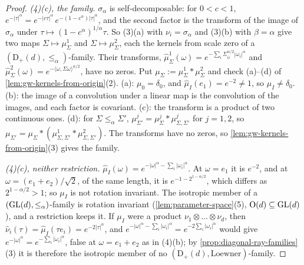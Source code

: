 \begin{proof}
\emph{(4)(c), the family.} $\sigma_\alpha$ is self-decomposable: for $0 < c < 1$,
$e^{-|\tau|^\alpha} = e^{-|c\tau|^\alpha}\,e^{-(1-c^\alpha)|\tau|^\alpha}$, and the second factor is the
transform of the image of $\sigma_\alpha$ under $\tau \mapsto (1 - c^\alpha)^{1/\alpha}\tau$. So (3)(a) with
$\nu_i = \sigma_\alpha$ and (3)(b) with $\beta = \alpha$ give two maps $\Sigma \mapsto \mu^1_\Sigma$ and
$\Sigma \mapsto \mu^2_\Sigma$, each the kernels from scale zero of a $(\mathrm D_+(d), \le_\alpha)$-family. Their
transforms, $\widehat\mu^1_\Sigma(\omega) = e^{-\sum_i\Sigma_{ii}^{\alpha/2}|\omega_i|^\alpha}$ and
$\widehat\mu^2_\Sigma(\omega) = e^{-\langle\omega,\Sigma\omega\rangle^{\alpha/2}}$, have no zeros. Put
$\mu_\Sigma := \mu^1_\Sigma * \mu^2_\Sigma$ and check (a)--(d) of \ref{lem:gw-kernels-from-origin}(2). (a):
$\mu_0 = \delta_0$, and $\widehat\mu_I(e_1) = e^{-2} \ne 1$, so $\mu_I \ne \delta_0$. (b): the image of a
convolution under a linear map is the convolution of the images, and each factor is covariant. (c): the
transform is a product of two continuous ones. (d): for $\Sigma \le_\alpha \Sigma'$,
$\mu^j_{\Sigma'} = \mu^j_\Sigma * \mu^j_{\Sigma,\Sigma'}$ for $j = 1, 2$, so
$\mu_{\Sigma'} = \mu_\Sigma * (\mu^1_{\Sigma,\Sigma'} * \mu^2_{\Sigma,\Sigma'})$. The transforms have no
zeros, so \ref{lem:gw-kernels-from-origin}(3) gives the family.

\emph{(4)(c), neither restriction.} $\widehat\mu_I(\omega) = e^{-|\omega|^\alpha - \sum_i|\omega_i|^\alpha}$. At
$\omega = e_1$ it is $e^{-2}$, and at $\omega = (e_1 + e_2)/\sqrt2$, of the same length, it is
$e^{-1 - 2^{1-\alpha/2}}$, which differs as $2^{1-\alpha/2} > 1$; so $\mu_I$ is not rotation invariant. The
isotropic member of a $(\mathrm{GL}(d), \le_\alpha)$-family is rotation invariant (\ref{lem:parameter-space}(5),
$\mathrm{O}(d) \subseteq \mathrm{GL}(d)$), and a restriction keeps it. If $\mu_I$ were a product
$\nu_1 \otimes \dots \otimes \nu_d$, then $\widehat\nu_i(\tau) = \widehat\mu_I(\tau e_i) = e^{-2|\tau|^\alpha}$, and
$e^{-|\omega|^\alpha - \sum_i|\omega_i|^\alpha} = e^{-2\sum_i|\omega_i|^\alpha}$ would give
$e^{-|\omega|^\alpha} = e^{-\sum_i|\omega_i|^\alpha}$, false at $\omega = e_1 + e_2$ as in (4)(b); by
\ref{prop:diagonal-ray-families}(3) it is therefore the isotropic member of no
$(\mathrm D_+(d), \text{Loewner})$-family.
\end{proof}
